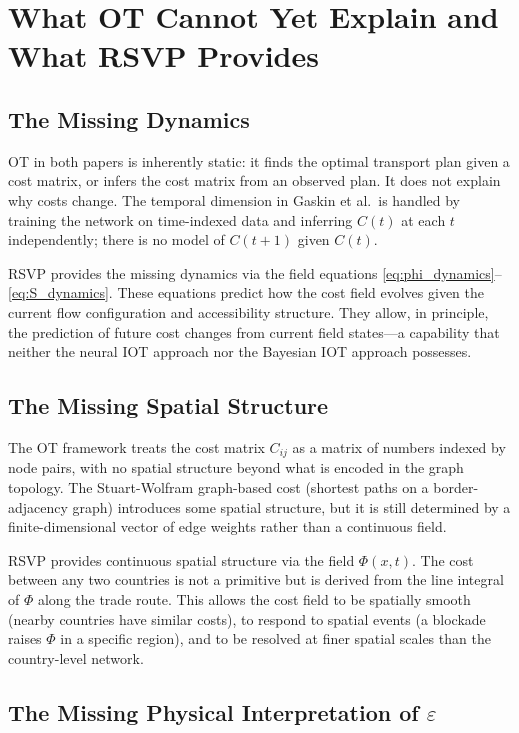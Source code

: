 \documentclass[12pt]{article}
\newcommand{\eps}{\varepsilon}
\begin{document}
\section{What OT Cannot Yet Explain and What RSVP Provides}

\subsection{The Missing Dynamics}

OT in both papers is inherently static: it finds the optimal transport plan given a cost matrix, or infers the cost matrix from an observed plan. It does not explain why costs change. The temporal dimension in Gaskin et al.\ is handled by training the network on time-indexed data and inferring $C(t)$ at each $t$ independently; there is no model of $C(t+1)$ given $C(t)$.

RSVP provides the missing dynamics via the field equations \eqref{eq:phi_dynamics}--\eqref{eq:S_dynamics}. These equations predict how the cost field evolves given the current flow configuration and accessibility structure. They allow, in principle, the prediction of future cost changes from current field states---a capability that neither the neural IOT approach nor the Bayesian IOT approach possesses.

\subsection{The Missing Spatial Structure}

The OT framework treats the cost matrix $C_{ij}$ as a matrix of numbers indexed by node pairs, with no spatial structure beyond what is encoded in the graph topology. The Stuart-Wolfram graph-based cost (shortest paths on a border-adjacency graph) introduces some spatial structure, but it is still determined by a finite-dimensional vector of edge weights rather than a continuous field.

RSVP provides continuous spatial structure via the field $\Phi(x,t)$. The cost between any two countries is not a primitive but is derived from the line integral of $\Phi$ along the trade route. This allows the cost field to be spatially smooth (nearby countries have similar costs), to respond to spatial events (a blockade raises $\Phi$ in a specific region), and to be resolved at finer spatial scales than the country-level network.

\subsection{The Missing Physical Interpretation of $\eps$}
\end{document}
